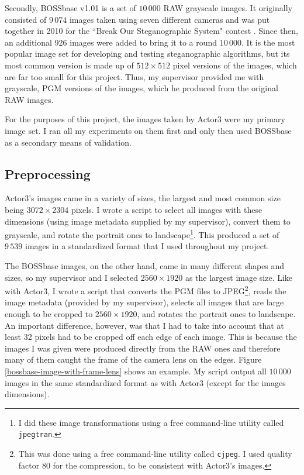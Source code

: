 \documentclass[11pt,a4paper,twoside,openright]{report}
\begin{document}
Secondly, BOSSbase v1.01 \cite{binghamton-downloads} is a set of $10\,000$ RAW grayscale images. It originally consisted of $9\,074$ images taken using seven different cameras and was put together in 2010 for the ``Break Our Steganographic System" contest \cite{bossbase}. Since then, an additional 926 images were added to bring it to a round $10\,000$. It is the most popular image set for developing and testing steganographic algorithms, but its most common version is made up of $512\times512$ pixel versions of the images, which are far too small for this project. Thus, my supervisor provided me with grayscale, PGM versions of the images, which he produced from the original RAW images.

For the purposes of this project, the images taken by Actor3 were my primary image set. I ran all my experiments on them first and only then used BOSSbase as a secondary means of validation.

\subsection{Preprocessing} \label{sec:preprocessing}
Actor3's images came in a variety of sizes, the largest and most common size being $3072\times2304$ pixels. I wrote a script to select all images with these dimensions (using image metadata supplied by my supervisor), convert them to grayscale, and rotate the portrait ones to landscape\footnote{I did these image transformations using a free command-line utility called \texttt{jpegtran}.}. This produced a set of $9\,539$ images in a standardized format that I used throughout my project.

The BOSSbase images, on the other hand, came in many different shapes and sizes, so my supervisor and I selected $2560\times1920$ as the largest image size. Like with Actor3, I wrote a script that converts the PGM files to JPEG\footnote{This was done using a free command-line utility called \texttt{cjpeg}. I used quality factor 80 for the compression, to be consistent with Actor3's images.}, reads the image metadata (provided by my supervisor), selects all images that are large enough to be cropped to $2560\times1920$, and rotates the portrait ones to landscape. An important difference, however, was that I had to take into account that at least 32 pixels had to be cropped off each edge of each image. This is because the images I was given were produced directly from the RAW ones and therefore many of them caught the frame of the camera lens on the edges. Figure \ref{bossbase-image-with-frame-lens} shows an example. My script output all $10\,000$ images in the same standardized format as with Actor3 (except for the images dimensions).
\end{document}
